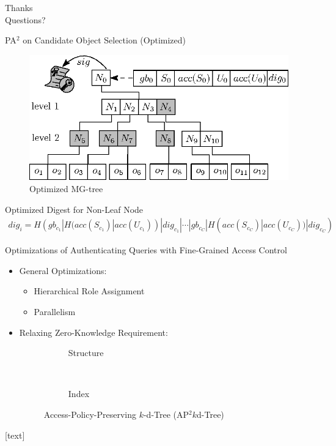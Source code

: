 \documentclass[xcolor={dvipsnames},aspectratio=169,10pt]{beamer}
\begin{document}
\begin{frame}[standout]
  Thanks \\
  Questions?
\end{frame}

\appendix%

\begin{frame}{PA$^2$ on Candidate Object Selection (Optimized)}
  \begin{figure}
    \includegraphics[width=.4\linewidth]{figs/aggregate-queries/grid_tree_opt.eps}
    \caption{Optimized MG-tree}
  \end{figure}
  \begin{alertblock}{Optimized Digest for Non-Leaf Node}
    \begin{align*}
      dig_i = H(gb_{c_1} | H(acc(S_{c_1})| acc(U_{c_1})) | dig_{c_1} | \dotsb
      |gb_{c_C} | H(acc(S_{c_C})|acc(U_{c_C})) | dig_{c_C})
    \end{align*}
  \end{alertblock}
\end{frame}

\begin{frame}{Optimizations of Authenticating Queries with Fine-Grained Access Control}
  \begin{itemize}[<+->]
    \item \alert{General Optimizations}:
      \begin{itemize}[<1->]
        \item Hierarchical Role Assignment
        \item Parallelism
      \end{itemize}
    \item \alert{Relaxing Zero-Knowledge Requirement}:
      \begin{figure}
        \begin{subfigure}[b]{.5\linewidth}
          \centering
          \resizebox{\linewidth}{!}{}
          \caption{Structure}
        \end{subfigure}~%
        \begin{subfigure}[b]{.5\linewidth}
          \centering
          \resizebox{\linewidth}{!}{}
          \caption{Index}
        \end{subfigure}
        \caption{Access-Policy-Preserving $k$-d-Tree (AP$^2k$d-Tree)}
      \end{figure}
  \end{itemize}
\end{frame}

\begingroup
{}
\begin{frame}[t,allowframebreaks]{\refname}
  [text]
  \renewcommand*{\bibfont}{\scriptsize}
  \printbibliography[heading=none]%
\end{frame}
\endgroup
\end{document}
